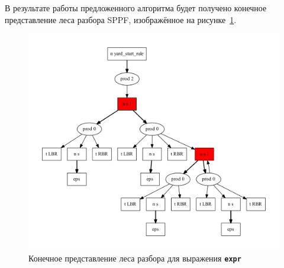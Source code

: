 В результате работы предложенного алгоритма будет получено конечное представление леса разбора SPPF, изображённое на рисунке~\ref{sppf}.

\begin{figure}[!h]
 \centering
 \includegraphics[width=15cm]{pics/sppf.pdf}
 \caption{Конечное представление леса разбора для выражения \textbf{\texttt{expr}}}
 \label{sppf}
\end{figure}

